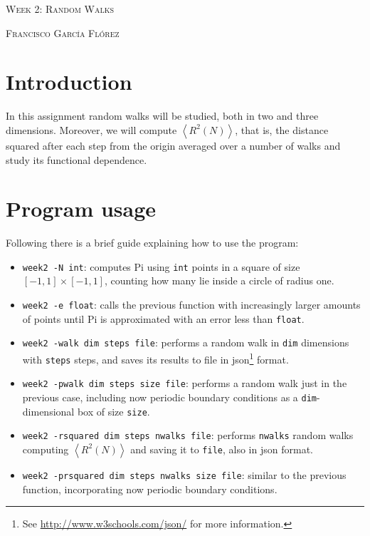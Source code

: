 \documentclass[10 pt]{article}
\newcommand{\avg}[1]{\left\langle #1 \right\rangle}
\begin{document}

\begin{center}
  \Large \textsc{Week 2: Random Walks}
\end{center}

\begin{center}
  \large \textsc{Francisco García Flórez}
\end{center}

\section{Introduction}

In this assignment random walks will be studied, both in two and three dimensions. Moreover, we will compute $\avg{R^2(N)}$, that is, the distance squared after each step from the origin averaged over a number of walks and study its functional dependence.


\section{Program usage}

Following there is a brief guide explaining how to use the program:

\begin{itemize}
  \item \texttt{week2 -N int}: computes Pi using \texttt{int} points in a square of size $[-1,1]\times[-1,1]$, counting how many lie inside a circle of radius one.
  \item \texttt{week2 -e float}: calls the previous function with increasingly larger amounts of points until Pi is approximated with an error less than \texttt{float}.
  \item \texttt{week2 -walk dim steps file}: performs a random walk in \texttt{dim} dimensions with \texttt{steps} steps, and saves its results to file in json\footnote{See \url{http://www.w3schools.com/json/} for more information.} format.
  \item \texttt{week2 -pwalk dim steps size file}: performs a random walk just in the previous case, including now periodic boundary conditions as a \texttt{dim}-dimensional box of size \texttt{size}.
  \item \texttt{week2 -rsquared dim steps nwalks file}: performs \texttt{nwalks} random walks computing $\avg{R^2(N)}$ and saving it to \texttt{file}, also in json format.
  \item \texttt{week2 -prsquared dim steps nwalks size file}: similar to the previous function, incorporating now periodic boundary conditions.
\end{itemize}
\end{document}
